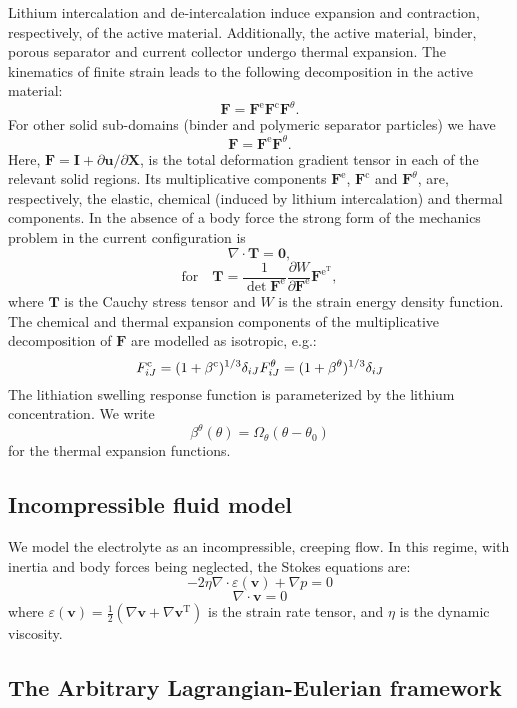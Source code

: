 Lithium intercalation and de-\/intercalation induce expansion and contraction, respectively, of the active material. Additionally, the active material, binder, porous separator and current collector undergo thermal expansion. The kinematics of finite strain leads to the following decomposition in the active material\+: \[ \boldsymbol{F}=\boldsymbol{F}^\text{e}\boldsymbol{F}^\text{c}\boldsymbol{F}^{\theta}. \] For other solid sub-\/domains (binder and polymeric separator particles) we have \[ \boldsymbol{F}=\boldsymbol{F}^\text{e}\boldsymbol{F}^{\theta}. \] Here, $\boldsymbol{F} = \boldsymbol{I} + \partial\boldsymbol{u}/\partial\boldsymbol{X}$, is the total deformation gradient tensor in each of the relevant solid regions. Its multiplicative components $\boldsymbol{F}^\text{e}$, $\boldsymbol{F}^\text{c}$ and $\boldsymbol{F}^{\theta}$, are, respectively, the elastic, chemical (induced by lithium intercalation) and thermal components. In the absence of a body force the strong form of the mechanics problem in the current configuration is \[ \nabla\cdot\boldsymbol{T} = \boldsymbol{0}, \] \[ \text{for}\quad \boldsymbol{T}= \frac{1}{\det{\boldsymbol{F}^\text{e}}}\frac{\partial W}{\partial \boldsymbol{F}^\text{e}}\boldsymbol{F}^{\text{e}^\text{T}}, \] where $\boldsymbol{T}$ is the Cauchy stress tensor and $W$ is the strain energy density function. The chemical and thermal expansion components of the multiplicative decomposition of $\boldsymbol{F}$ are modelled as isotropic, e.\+g.\+: \[ F^{\text{c}}_{iJ}=(1+\beta^{\text{c}})^{1/3}\delta_{iJ} \\ F^{\theta}_{iJ}=(1+\beta^{\theta})^{1/3}\delta_{iJ} \] The lithiation swelling response function is parameterized by the lithium concentration. We write \[ \beta^{\theta}(\theta)=\Omega_{\theta} (\theta-\theta_0) \] for the thermal expansion functions.\hypertarget{battery_particle_section4}{}\subsection{Incompressible fluid model}\label{battery_particle_section4}
We model the electrolyte as an incompressible, creeping flow. In this regime, with inertia and body forces being neglected, the Stokes equations are\+: \[ -2\eta\nabla\cdot\varepsilon(\boldsymbol{v})+\nabla p=0 \] \[ \nabla\cdot\boldsymbol{v}=0 \] where $\varepsilon(\boldsymbol{v})=\frac{1}{2}(\nabla\boldsymbol{v}+\nabla\boldsymbol{v}^\text{T})$ is the strain rate tensor, and $\eta$ is the dynamic viscosity.\hypertarget{battery_particle_section5}{}\subsection{The Arbitrary Lagrangian-\/\+Eulerian framework}\label{battery_particle_section5}
